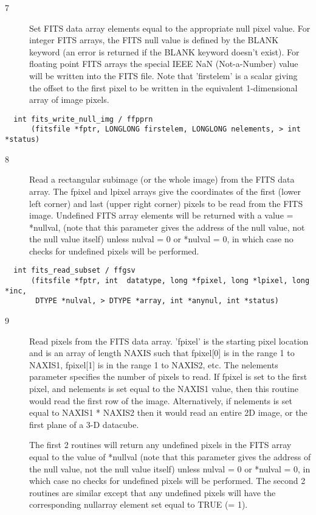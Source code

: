 \documentclass[11pt]{book}
\begin{document}
\begin{description}
\item[7 ] Set FITS data array elements equal to the appropriate null pixel
    value. For integer FITS arrays, the FITS null value is defined by
    the BLANK keyword  (an error is returned if the BLANK keyword
    doesn't exist). For floating point FITS arrays the special IEEE NaN
    (Not-a-Number) value will be written into the FITS file.  Note that
    'firstelem' is a scalar giving the  offset to the first pixel to be
    written in the equivalent 1-dimensional array of image pixels. \label{ffpprn}
\end{description}

\begin{verbatim}
  int fits_write_null_img / ffpprn
      (fitsfile *fptr, LONGLONG firstelem, LONGLONG nelements, > int *status)
\end{verbatim}

\begin{description}
\item[8 ] Read a rectangular subimage (or the whole image) from the FITS
    data array.  The fpixel and lpixel arrays give the coordinates of
    the first (lower left corner) and last (upper right corner) pixels
    to be read from the FITS image. Undefined FITS array elements will
    be returned with a value = *nullval, (note that this parameter
    gives the address of the null value, not the null value itself)
    unless nulval = 0 or *nulval = 0, in which case no checks for
   undefined pixels will be performed.  \label{ffgsv}
\end{description}

\begin{verbatim}
  int fits_read_subset / ffgsv
      (fitsfile *fptr, int  datatype, long *fpixel, long *lpixel, long *inc,
       DTYPE *nulval, > DTYPE *array, int *anynul, int *status)
\end{verbatim}

\begin{description}
\item[9 ] Read pixels from the FITS data array.  'fpixel' is the starting
    pixel location and is an array of length NAXIS such that fpixel[0]
    is in the range 1 to NAXIS1, fpixel[1] is in the range 1 to NAXIS2,
    etc. The nelements parameter specifies the number of pixels to
    read.  If fpixel is set to the first pixel, and nelements is set
    equal to the NAXIS1 value, then this routine would read the first
    row of the image.  Alternatively, if nelements is set equal to
    NAXIS1 * NAXIS2 then it would read an entire 2D image, or the first
    plane of a 3-D datacube.

    The first 2 routines will return any undefined pixels in the FITS array
    equal to the value of *nullval (note that this parameter gives the
    address of the null value, not the null value itself) unless nulval
    = 0 or *nulval = 0, in which case no checks for undefined pixels
    will be performed.  The second 2 routines are similar except that any
    undefined pixels will have the corresponding nullarray element set
   equal to TRUE (= 1).  \label{ffgpxv}  \label{ffgpxf}
\end{description}
\end{document}

